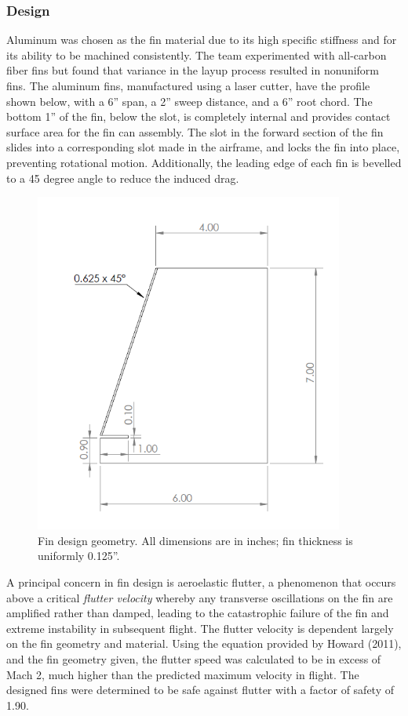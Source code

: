 \subsubsection*{Design}
Aluminum was chosen as the fin material due to its high specific stiffness and for its ability to be machined consistently. The team experimented with all-carbon fiber fins but found that variance in the layup process resulted in nonuniform fins. The aluminum fins, manufactured using a laser cutter, have the profile shown below, with a 6” span, a 2” sweep distance, and a 6” root chord. The bottom 1” of the fin, below the slot, is completely internal and provides contact surface area for the fin can assembly. The slot in the forward section of the fin slides into a corresponding slot made in the airframe, and locks the fin into place, preventing rotational motion. Additionally, the leading edge of each fin is bevelled to a 45 degree angle to reduce the induced drag.
\begin{figure}[H]
	\centering
	\includegraphics[width=4in]{imgs/fingeo.png}
	\caption{Fin design geometry. All dimensions are in inches; fin thickness is uniformly 0.125''.}
	\label{fig:fingeo}
\end{figure}
A principal concern in fin design is aeroelastic flutter, a phenomenon that occurs above a critical \textit{flutter velocity} whereby any transverse oscillations on the fin are amplified rather than damped, leading to the catastrophic failure of the fin and extreme instability in subsequent flight. The flutter velocity is dependent largely on the fin geometry and material. Using the equation provided by Howard (2011), and the fin geometry given, the flutter speed was calculated to be in excess of Mach 2, much higher than the predicted maximum velocity in flight. The designed fins were determined to be safe against flutter with a factor of safety of 1.90.

